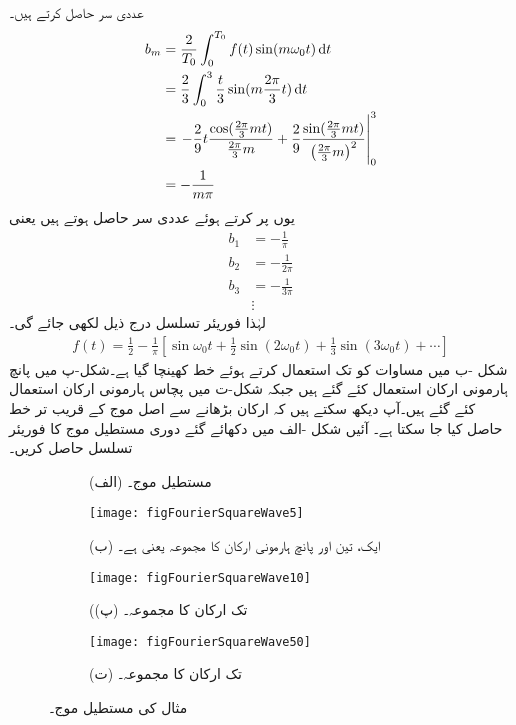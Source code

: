 عددی سر  حاصل کرتے ہیں۔
\begin{align*}
b_m&=\frac{2}{T_0}\int_0^{T_0} f(t)\sin(m\omega_0 t) \dif t\\
&=\frac{2}{3}\int_0^3 \frac{t}{3}\sin (m\frac{2\pi}{3} t) \dif t\\
&=\left.-\frac{2}{9}t\frac{\cos(\frac{2\pi}{3}mt)}{\frac{2\pi}{3}m}+\frac{2}{9}\frac{\sin(\frac{2\pi}{3}mt)}{\left(\frac{2\pi}{3}m\right)^2}\right|_0^3\\
&=-\frac{1}{m\pi}
\end{align*}
یوں  پر کرتے ہوئے عددی سر حاصل ہوتے ہیں یعنی
\begin{align*}
b_1&=-\frac{1}{\pi}\\
b_2&=-\frac{1}{2\pi}\\
b_3&=-\frac{1}{3\pi}\\
&\vdots
\end{align*}
لہٰذا فوریئر تسلسل درج ذیل لکھی جائے گی۔
\begin{align}\label{مساوات_فوریئر_دندان_موج}
f(t)=\frac{1}{2}-\frac{1}{\pi}\left[\sin \omega_0 t+\frac{1}{2} \sin (2\omega_0 t) +\frac{1}{3} \sin (3\omega_0 t)+\cdots\right]
\end{align}
شکل -ب میں  مساوات  کو  تک استعمال کرتے ہوئے خط کھینچا گیا ہے۔شکل-پ میں پانچ ہارمونی ارکان استعمال کئے گئے ہیں جبکہ شکل-ت میں پچاس ہارمونی ارکان استعمال کئے گئے ہیں۔آپ دیکھ سکتے ہیں کہ ارکان بڑھانے سے اصل موج کے قریب تر خط حاصل کیا جا سکتا ہے۔
آئیں شکل -الف  میں دکھائے گئے  دوری مستطیل موج کا فوریئر تسلسل حاصل کریں۔
\begin{figure}
\centering
\begin{subfigure}{0.5\textwidth}
\centering
{}
\caption*{(الف) مستطیل موج۔}
\end{subfigure}%
\begin{subfigure}{0.5\textwidth}
\centering
\texttt{[image: figFourierSquareWave5]}
\caption*{(ب) ایک، تین اور پانچ ہارمونی ارکان کا مجموعہ یعنی  ہے۔}
\end{subfigure}
\begin{subfigure}{0.5\textwidth}
\centering
\texttt{[image: figFourierSquareWave10]}
\caption*{((پ)  تک ارکان کا مجموعہ۔}
\end{subfigure}%
\begin{subfigure}{0.5\textwidth}
\centering
\texttt{[image: figFourierSquareWave50]}
\caption*{(ت)  تک ارکان کا مجموعہ۔}
\end{subfigure}
\caption{مثال  کی مستطیل موج۔}
\label{شکل_فوریئر_مستطیل_موج_الف}
\end{figure}

